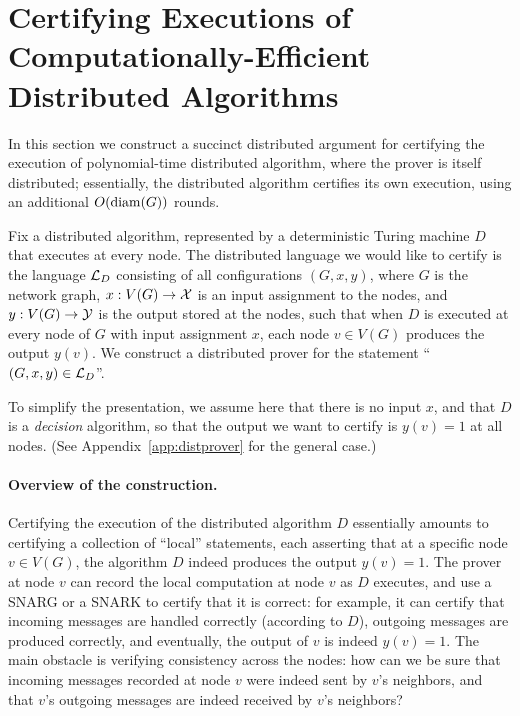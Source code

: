 \section{Certifying Executions of Computationally-Efficient Distributed Algorithms}
\label{sec:distprover}
In this section we construct a succinct distributed argument
for certifying the execution of polynomial-time distributed algorithm,
where the prover is itself distributed;
essentially, the distributed algorithm certifies its own execution,
using an additional $O(\operatorname{diam}(G))$ rounds.


Fix a distributed algorithm, represented by a deterministic Turing machine $D$ that
executes at every node.
The distributed language we would like to certify is the language
$\mathcal{L}_D$
consisting of all configurations $(G, x, y)$,
where $G$ is the network graph, $x : V(G) \rightarrow \mathcal{X}$ is an input assignment to the nodes,
and $y : V(G) \rightarrow \mathcal{Y}$ is the output stored at the nodes,
such that when $D$ is executed at every node of $G$ with input assignment $x$,
each node $v \in V(G)$ produces the output $y(v)$.
We construct a distributed prover for the statement ``$(G,x,y) \in \mathcal{L}_D$''.

To simplify the presentation, we assume here that there is no input $x$,
and that $D$ is a \emph{decision} algorithm,
so that the output we want to certify is $y(v) = 1$ at all nodes.
(See Appendix~\ref{app:distprover} for the general case.)

\paragraph{Overview of the construction.}
Certifying the execution of the distributed algorithm $D$
essentially amounts to certifying a collection of ``local'' statements,
each asserting that at a specific node $v \in V(G)$,
the algorithm $D$ indeed produces the output $y(v) = 1$.
The prover at node $v$ can record the local computation at node $v$
as $D$ executes,
and use a SNARG or a SNARK
to certify that it is correct: for example, it can certify that incoming messages
are handled correctly (according to $D$),
outgoing messages are produced correctly, and eventually, the output of $v$ is indeed $y(v) = 1$.
The main obstacle is verifying consistency across the nodes:
how can we be sure that incoming messages recorded at node $v$ were indeed sent by $v$'s neighbors,
and that $v$'s outgoing messages are indeed received by $v$'s neighbors?


